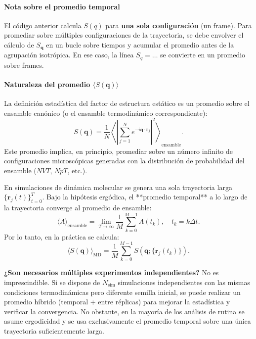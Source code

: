 \documentclass{tufte-handout}
\begin{document}
\paragraph*{Nota sobre el promedio temporal}

El código anterior calcula $S(q)$ para \textbf{una sola configuración} (un frame). Para promediar sobre múltiples configuraciones de la trayectoria, se debe envolver el cálculo de $S_{\mathbf{q}}$ en un bucle sobre tiempos y acumular el promedio antes de la agrupación isotrópica. En ese caso, la línea $S_q = \dots$ se convierte en un promedio sobre frames.

\newpage

\paragraph*{Naturaleza del promedio $\langle S(\mathbf{q}) \rangle$}

La definición estadística del factor de estructura estático es un promedio sobre el ensamble canónico (o el ensamble termodinámico correspondiente):
\begin{equation}
S(\mathbf{q}) = \frac{1}{N} \left\langle \left| \sum_{j=1}^N e^{-i\mathbf{q}\cdot\mathbf{r}_j} \right|^2 \right\rangle_{\text{ensamble}}.
\end{equation}
Este promedio implica, en principio, promediar sobre un número infinito de configuraciones microscópicas generadas con la distribución de probabilidad del ensamble ($NVT$, $NpT$, etc.).

En simulaciones de dinámica molecular se genera una sola trayectoria larga $\{\mathbf{r}_j(t)\}_{t=0}^{T}$. Bajo la hipótesis ergódica, el **promedio temporal** a lo largo de la trayectoria converge al promedio de ensamble:
\begin{equation}
\langle A \rangle_{\text{ensamble}} = \lim_{T \to \infty} \frac{1}{M} \sum_{k=0}^{M-1} A(t_k), \quad t_k = k\Delta t.
\end{equation}
Por lo tanto, en la práctica se calcula:
\begin{equation}
\langle S(\mathbf{q}) \rangle_{\text{MD}} = \frac{1}{M} \sum_{k=0}^{M-1} S(\mathbf{q}; \{\mathbf{r}_j(t_k)\}).
\end{equation}

\textbf{¿Son necesarios múltiples experimentos independientes?} No es imprescindible. Si se dispone de $N_{\text{sim}}$ simulaciones independientes con las mismas condiciones termodinámicas pero diferente semilla inicial, se puede realizar un promedio híbrido (temporal + entre réplicas) para mejorar la estadística y verificar la convergencia. No obstante, en la mayoría de los análisis de rutina se asume ergodicidad y se usa exclusivamente el promedio temporal sobre una única trayectoria suficientemente larga.
\end{document}
